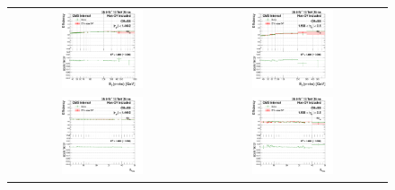 \begin{figure}[bh]
  \begin{center}
    \begin{tabular}{cc}
      \includegraphics[width=0.45\textwidth]{figures/Zprime/2016/ScaleFactor/SameSign/N_1_eff/g_compare_cut_Et_Barrel_ea_ta_inc_AS_N_1_DPhiIn_PUW.png} &
      \includegraphics[width=0.45\textwidth]{figures/Zprime/2016/ScaleFactor/SameSign/N_1_eff/g_compare_cut_Et_Endcap_ea_ta_inc_AS_N_1_DPhiIn_PUW.png} \\
      \includegraphics[width=0.45\textwidth]{figures/Zprime/2016/ScaleFactor/SameSign/N_1_eff/g_compare_cut_nVtx_Barrel_ea_ta_inc_AS_N_1_DPhiIn_PUW.png} &
      \includegraphics[width=0.45\textwidth]{figures/Zprime/2016/ScaleFactor/SameSign/N_1_eff/g_compare_cut_nVtx_Endcap_ea_ta_inc_AS_N_1_DPhiIn_PUW.png} \\

\end{tabular}
\end{center}
\end{figure}
